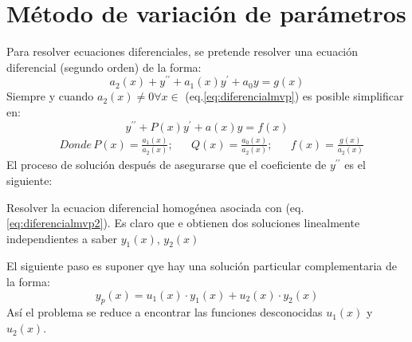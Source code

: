 \section{Método de variación de parámetros}	

Para resolver ecuaciones diferenciales, se pretende resolver una ecuación diferencial (segundo orden) de la forma:
\begin{equation}
    a_2(x) + y^{\prime\prime} + a_1(x)y^{\prime} + a_0y = g(x)
    \label{eq:diferencialmvp}
\end{equation}
Siempre y cuando $a_2(x)\neq 0\forall x\in$ (eq.\eqref{eq:diferencialmvp}) es posible simplificar en:
\begin{equation}
    y^{\prime\prime} + P(x)y^{\prime} + a(x)y = f(x)
    \label{eq:diferencialmvp2}
\end{equation}
\begin{align*}
    &Donde\, P(x) = \frac{a_1(x)}{a_2(x)};&&Q(x) = \frac{a_0(x)}{a_2(x)};&&f(x) = \frac{g(x)}{a_2(x)}
\end{align*}
El proceso de solución después de asegurarse que el coeficiente de $y^{\prime\prime}$ es el siguiente:

Resolver la ecuacion diferencial homogénea asociada con (eq. \eqref{eq:diferencialmvp2}). Es claro que e obtienen dos soluciones linealmente independientes a saber $y_1(x)$, $y_2(x)$

El siguiente paso es suponer qye hay una solución particular complementaria de la forma:
\begin{equation}
    y_p(x) = u_1(x)\cdot y_1(x) + u_2(x)\cdot y_2(x)
    \label{eq:diferencialmvp3}
\end{equation}
Así el problema se reduce a encontrar las funciones desconocidas $u_1(x)$ y $u_2(x)$.

